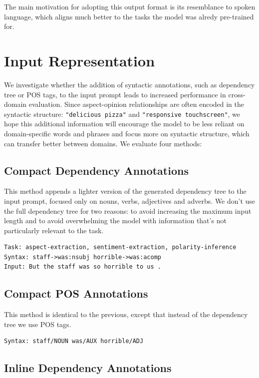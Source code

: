 \documentclass[12pt,a4paper]{report}
\begin{document}
The main motivation for adopting this output format is its resemblance to spoken language, 
which aligns much better to the tasks the model was alredy pre-trained for.


\section{Input Representation}\label{sec:syntax}

We investigate whether the addition of syntactic annotations, such as dependency tree or POS tags, to the input prompt leads to increased performance in cross-domain evaluation. 
Since aspect-opinion relationships are often encoded in the syntactic 
structure: \texttt{"delicious pizza"} and \texttt{"responsive touchscreen"}, we hope this additional 
information will encourage the model to be less reliant on domain-specific words and 
phrases and focus more on syntactic structure, which can transfer better between domains. 
We evaluate four methods:

\subsection{Compact Dependency Annotations}

This method appends a lighter version of the generated dependency tree to the input prompt, focused only on nouns, verbs, adjectives and adverbs. 
We don't use the full dependency tree for two reasons: to avoid increasing the maximum input length and to avoid overwhelming the model with information that's not particularly relevant to the task.

\begin{lstlisting}
Task: aspect-extraction, sentiment-extraction, polarity-inference
Syntax: staff->was:nsubj horrible->was:acomp
Input: But the staff was so horrible to us .
\end{lstlisting}

\subsection{Compact POS Annotations}

This method is identical to the previous, except that instead of the dependency tree we use POS tags.

\begin{lstlisting}
Syntax: staff/NOUN was/AUX horrible/ADJ
\end{lstlisting}

\subsection{Inline Dependency Annotations}
\end{document}
